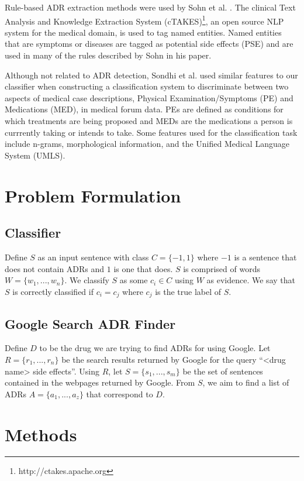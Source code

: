 \documentclass{acm_proc_article-sp}
\begin{document}
Rule-based ADR extraction methods were used by Sohn et al. \cite{Sohn}. The clinical Text Analysis and Knowledge Extraction System (cTAKES)\footnote{http://ctakes.apache.org}, an open source NLP system for the medical domain, is used to tag named entities. Named entities that are symptoms or diseases are tagged as potential side effects (PSE) and are used in many of the rules described by Sohn in his paper.

Although not related to ADR detection, Sondhi et al. \cite{Sondhi}  used similar features to our classifier when constructing a classification system to discriminate between two aspects of medical case descriptions, Physical Examination/Symptoms (PE) and Medications (MED), in medical forum data. PEs are defined as conditions for which treatments are being proposed and MEDs are the medications a person is currrently taking or intends to take. Some features used for the classification task include n-grams, morphological information, and the Unified Medical Language System (UMLS).

\section{Problem Formulation}
\subsection{Classifier}
Define $S$ as an input sentence with class $C = \{-1,1\}$ where $-1$ is a sentence that does not contain ADRs and $1$ is one that does. $S$ is comprised of words $W = \{w_1,...,w_n\}$. We classify $S$ as some $c_i \in C$ using $W$ as evidence. We say that $S$ is correctly classified if $c_i=c_j$ where $c_j$ is the true label of $S$. 
\subsection{Google Search ADR Finder}
Define $D$ to be the drug we are trying to find ADRs for using Google. Let $R = \{r_1,...,r_n\}$ be the search results returned by Google for the query ``<drug name> side effects''. Using $R$, let $S= \{s_1,...,s_m\}$ be the set of sentences contained in the webpages returned by Google. From $S$, we aim to find a list of ADRs $A = \{a_1,...,a_z\}$ that correspond to $D$.

\section{Methods}
\end{document}
